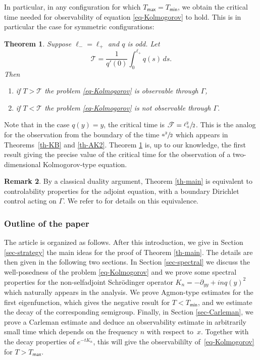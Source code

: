 \documentclass[10pt]{amsart}
\let\mathcal\mathscr
\theoremstyle{plain}
\newtheorem{theorem}{{Theorem}}[section]
\theoremstyle{definition}
\newtheorem{remark}[theorem]{Remark}
\newcommand{\1}{\mathds 1}
\newcommand{\Tc}{{\mathcal T}}
\newcommand{\Tmin}{T_{\mathsf{min}}}
\newcommand{\Tmax}{T_{\mathsf{max}}}
\begin{document}
In particular, in any configuration for which $\Tmax=\Tmin$, we obtain the critical time needed
for observability of equation \eqref{eq-Kolmogorov} to hold. This is in particular the case for symmetric configurations:


\begin{theorem} \label{th-cas-symetrique}
Suppose $\ell_- = \ell_+$ and $q$ is odd. Let
\[
\Tc = \frac{1}{q'(0)} \int_0^{\ell_+} q(s) \, ds.
\]
Then
\begin{enumerate}
\item if $T > \Tc$ the problem \eqref{eq-Kolmogorov} is observable through $\Gamma$,
\item if $T < \Tc$ the problem \eqref{eq-Kolmogorov} is not observable through $\Gamma$.
\end{enumerate}
\end{theorem}


Note that in the case $q(y) = y$, the critical time is $\Tc = \sfrac{\ell_+^2}{2}$. This is the analog for the observation from the boundary of the time $\sfrac {a^2}2$ which appears in Theorems~\ref{th-KB} and \ref{th-AK2}. Theorem \ref{th-cas-symetrique} is,
up to our knowledge, the first result giving the precise value of the critical time for the observation
of a two-dimensional Kolmogorov-type equation.

\begin{remark}
By a classical duality argument, Theorem \ref{th-main} is equivalent to controlability properties for the adjoint equation, with a boundary Dirichlet control acting on $\Gamma$. We refer to \cite{tucsnak} for details on this equivalence.
\end{remark}

\subsubsection*{Outline of the paper} The article is organized as follows. After this introduction, we give in Section \ref{sec-strategy} the main ideas for the proof of Theorem \ref{th-main}. The details are then given in the following two sections. In Section \ref{sec-spectral} we discuss the well-posedness of the problem \eqref{eq-Kolmogorov} and we prove some spectral properties for the non-selfadjoint Schrödinger operator $K_n = -\partial_{yy} + inq(y)^2$ which naturally appears in the analysis. We prove Agmon-type estimates for the first eigenfunction, which gives the negative result for $T < \Tmin$, and we estimate the decay of the corresponding semigroup. Finally, in Section \ref{sec-Carleman}, we prove a Carleman estimate and deduce an observability estimate in arbitrarily small time which depends on the frequency $n$ with respect to~$x$. Together with the decay properties of $e^{-tK_n}$, this will give the observabililty of~\eqref{eq-Kolmogorov} for $T > \Tmax$.
\end{document}
